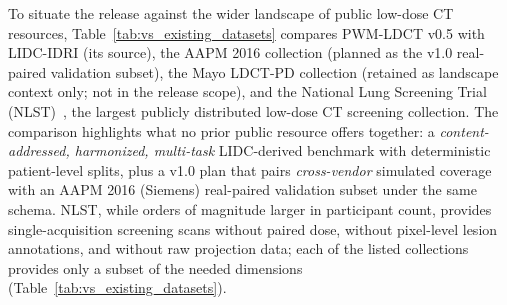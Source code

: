 \documentclass[twoside,11pt]{article}
\begin{document}
To situate the release against the wider landscape of public low-dose CT resources, Table~\ref{tab:vs_existing_datasets} compares PWM-LDCT v0.5 with LIDC-IDRI (its source), the AAPM 2016 collection (planned as the v1.0 real-paired validation subset), the Mayo LDCT-PD collection (retained as landscape context only; not in the release scope), and the National Lung Screening Trial (NLST)~\citep{nlst2011,nlst_data}, the largest publicly distributed low-dose CT screening collection. The comparison highlights what no prior public resource offers together: a \emph{content-addressed, harmonized, multi-task} LIDC-derived benchmark with deterministic patient-level splits, plus a v1.0 plan that pairs \emph{cross-vendor} simulated coverage with an AAPM 2016 (Siemens) real-paired validation subset under the same schema. NLST, while orders of magnitude larger in participant count, provides single-acquisition screening scans without paired dose, without pixel-level lesion annotations, and without raw projection data; each of the listed collections provides only a subset of the needed dimensions (Table~\ref{tab:vs_existing_datasets}).
\end{document}
